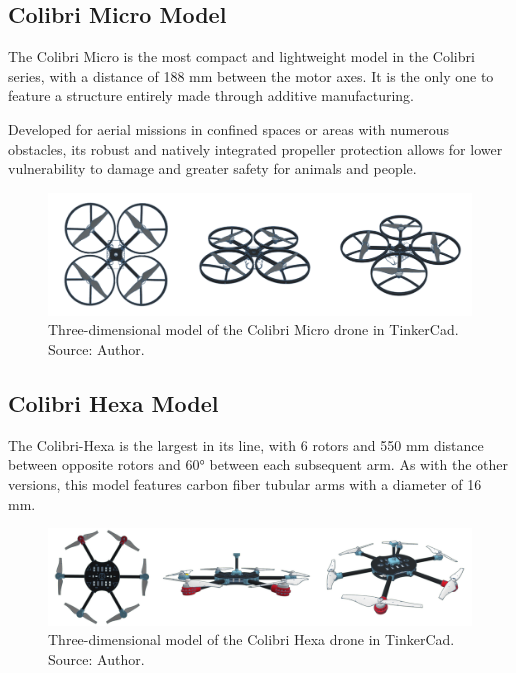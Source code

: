 \documentclass[conference]{IEEEtran}
\begin{document}
\subsection{Colibri Micro Model}

The Colibri Micro is the most compact and lightweight model in the Colibri series, with a distance of 188 mm between the motor axes. It is the only one to feature a structure entirely made through additive manufacturing.

Developed for aerial missions in confined spaces or areas with numerous obstacles, its robust and natively integrated propeller protection allows for lower vulnerability to damage and greater safety for animals and people.

\begin{figure}[!htb]
    \centering
    \includegraphics[scale=0.12]{img/Colibri-micro.png} 
    \caption{Three-dimensional model of the Colibri Micro drone in TinkerCad. Source: Author.}
    \label{fig:my_label}
\end{figure}

\subsection{Colibri Hexa Model}
The Colibri-Hexa is the largest in its line, with 6 rotors and 550 mm distance between opposite rotors and 60° between each subsequent arm. As with the other versions, this model features carbon fiber tubular arms with a diameter of 16 mm.

\begin{figure}[!htb]
    \centering
    \includegraphics[scale=0.14]{img/Colibri-hexa.png} 
    \caption{Three-dimensional model of the Colibri Hexa drone in TinkerCad. Source: Author.}
    \label{fig:my_label}
\end{figure}
\end{document}
